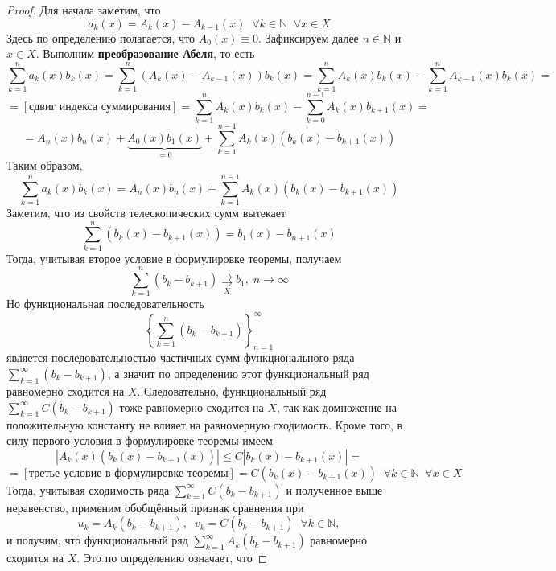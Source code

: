 \documentclass[11pt]{article}
\begin{document}
\begin{proof}
    Для начала заметим, что
    \[a_k (x) = A_k (x) - A_{k - 1} (x) \; \; \forall k \in \mathbb{N} \; \; \forall x \in X\]
    Здесь по определению полагается, что $A_0 (x) \equiv 0$. Зафиксируем далее $n \in \mathbb{N}$ и $x \in X$. Выполним \textbf{преобразование Абеля}, то есть
    \[\sum_{k = 1}^n a_k (x) b_k (x) = \sum_{k = 1}^n \left(A_k (x) - A_{k - 1} (x)\right) b_k (x) = \sum_{k = 1}^n A_k (x) b_k (x) - \sum_{k = 1}^n A_{k - 1} (x) b_k (x) = \]
    \[= [\text{сдвиг индекса суммирования}] = \sum_{k = 1}^n A_k (x) b_k (x) - \sum_{k = 0}^{n - 1} A_{k} (x) b_{k + 1} (x) = \]
    \[= A_n (x) b_n (x) + \underbrace{A_0 (x) b_1 (x)}_{=0} + \sum_{k = 1}^{n - 1} A_k (x) \left(b_k (x) - b_{k + 1} (x)\right)\]
    Таким образом,
    \begin{equation} \label{eq:1:3}
        \sum_{k = 1}^n a_k (x) b_k (x) = A_n (x) b_n (x) + \sum_{k = 1}^{n - 1} A_k (x) \left(b_k (x) - b_{k + 1} (x)\right)
    \end{equation}
    Заметим, что из свойств телескопических сумм вытекает
    \[\sum_{k = 1}^{n} (b_k (x) - b_{k + 1} (x)) = b_1 (x) - b_{n + 1} (x)\]
    Тогда, учитывая второе условие в формулировке теоремы, получаем
    \[\sum_{k = 1}^n (b_k - b_{k + 1}) \underset{X}{\rightrightarrows} b_1, \; n \to \infty\]
    Но функциональная последовательность \[\displaystyle \left\{\sum_{k = 1}^n (b_k - b_{k + 1})\right\}_{n = 1}^{\infty}\] является последовательностью частичных сумм функционального ряда $\displaystyle \sum_{k = 1}^{\infty} (b_k - b_{k + 1})$, а значит по определению этот функциональный ряд равномерно сходится на $X$. Следовательно, функциональный ряд $\displaystyle \sum_{k = 1}^{\infty} C (b_k - b_{k + 1})$ тоже равномерно сходится на $X$, так как домножение на положительную константу не влияет на равномерную сходимость.
    Кроме того, в силу первого условия в формулировке теоремы имеем
    \[\left\lvert A_k (x) \left(b_k (x) - b_{k + 1} (x)\right) \right\rvert \leq C \left\lvert b_k (x) - b_{k + 1} (x) \right\rvert = \]
    \[= [\text{третье условие в формулировке теоремы}] = C (b_k (x) - b_{k + 1} (x)) \; \; \forall k \in \mathbb{N} \; \; \forall x \in X\]
    Тогда, учитывая сходимость ряда $\displaystyle \sum_{k = 1}^{\infty} C (b_k - b_{k + 1})$ и полученное выше неравенство, применим обобщённый признак сравнения при
    \[u_k = A_k \left(b_k - b_{k + 1} \right), \; \; v_k = C \left(b_k - b_{k + 1} \right) \; \; \forall k \in \mathbb{N},\]
    и получим, что функциональный ряд $\displaystyle \sum_{k = 1}^{\infty} A_k \left(b_k - b_{k + 1}\right)$ равномерно сходится на $X$. Это по определению означает, что

\end{proof}
\end{document}
